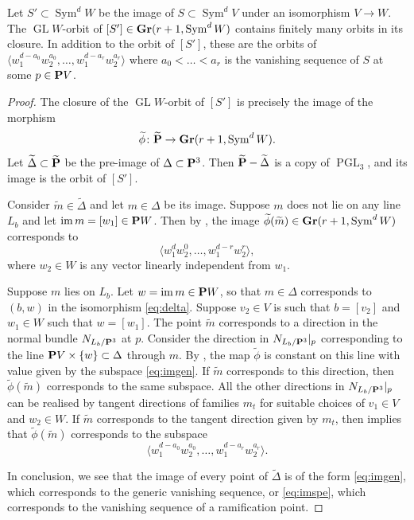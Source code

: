 \documentclass[11pt]{amsart}
\renewcommand {\P}{{\bf P}}
\providecommand {\Gr}{{\bf Gr}}
\providecommand{\GL}{\operatorname{GL}}
\providecommand{\PGL}{\operatorname{PGL}}
\providecommand{\Sym}{\operatorname{Sym}}
\providecommand{\im}{\operatorname{im}}
\begin{document}
\begin{theorem}\label{thm:orbitclosure}
  Let \(S' \subset \Sym^d W\) be the image of \(S \subset \Sym^d V\) under an isomorphism \(V \to W\).
  The \(\GL W\)-orbit of \([S'] \in \Gr(r+1, \Sym^d W)\) contains finitely many orbits in its closure.
  In addition to the orbit of \([S']\), these are the orbits of \(\langle  w_1^{d-a_0}w_2^{a_0}, \dots, w_1^{d-a_r}w_2^{a_r}\rangle\) where \(a_0< \dots< a_r\) is the vanishing sequence of \(S\) at some \(p \in \P V\).
\end{theorem}
\begin{proof}
  The closure of the \(\GL W\)-orbit of \([S']\) is precisely the image of the morphism
  \[ \widetilde \phi \colon \widetilde \P \to \Gr(r+1, \Sym^d W).\]
  Let \(\widetilde \Delta \subset \widetilde \P\) be the pre-image of \(\Delta \subset \P^3\).
  Then \(\widetilde \P - \widetilde \Delta\) is a copy of \(\PGL_3\), and its image is the orbit of \([S']\).

  Consider \(\widetilde m \in \widetilde \Delta\) and let \(m \in \Delta\) be its image.
  Suppose \(m\) does not lie on any line \(L_b\) and let \(\im m = [w_1] \in \P W\).
  Then by , the image \(\widetilde \phi(\widetilde m) \in \Gr(r+1, \Sym^d W)\) corresponds to
  \begin{equation}\label{eq:imgen}
    \langle w_1^d w_2^{0}, \dots, w_1^{d-r}w_2^{r}\rangle,
  \end{equation}
  where \(w_2 \in W\) is any vector linearly independent from \(w_1\).

  Suppose \(m\) lies on \(L_b\).
  Let \(w = \im m \in \P W\), so that \(m \in \Delta\) corresponds to \((b,w)\) in the isomorphism \eqref{eq:delta}.
  Suppose \(v_2 \in V\) is such that \(b = [v_2]\) and \(w_1 \in W\) such that \(w = [w_1]\).
  The point \(\widetilde m\) corresponds to a direction in the normal bundle \(N_{L_b/\P^3}\) at \(p\).
  Consider the direction in \(N_{L_b/\P^3}|_p\) corresponding to the line \(\P V \times \{w\} \subset \Delta\) through \(m\).
  By , the map \(\widetilde \phi\) is constant on this line with value given by the subspace \eqref{eq:imgen}.
  If \(\widetilde m\) corresponds to this direction, then \(\widetilde \phi(\widetilde m)\) corresponds to the same subspace.
  All the other directions in \(N_{L_b/\P^3}|_p\) can be realised by tangent directions of families \(m_t\) for suitable choices of \(v_1 \in V\) and \(w_2 \in W\).
  If \(\widetilde m\) corresponds to the tangent direction given by \(m_t\), then  implies that \(\widetilde \phi(\widetilde m)\) corresponds to the subspace
  \begin{equation}\label{eq:imspe}
    \langle  w_1^{d-a_0}w_2^{a_0}, \dots, w_1^{d-a_r}w_2^{a_r}\rangle.
  \end{equation}

  In conclusion, we see that the image of every point of \(\widetilde \Delta\) is of the form \eqref{eq:imgen}, which corresponds to the generic vanishing sequence, or \eqref{eq:imspe}, which corresponds to the vanishing sequence of a ramification point.
\end{proof}
\end{document}
